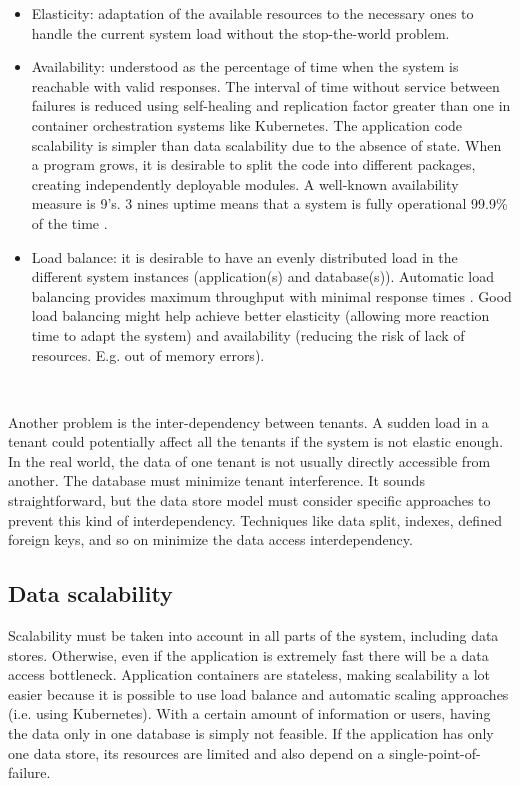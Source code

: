 \documentclass[12pt,english]{article} %
\begin{document}
\begin{itemize}
    \item Elasticity: adaptation of the available resources to the necessary ones to handle the current system load without the stop-the-world problem.
    \item Availability: understood as the percentage of time when the system is reachable with valid responses.
    The interval of time without service between failures is reduced using self-healing and replication factor greater than one in container orchestration systems like Kubernetes.
    The application code scalability is simpler than data scalability due to the absence of state.
    When a program grows, it is desirable to split the code into different packages, creating independently deployable modules.
    A well-known availability measure is 9’s. 3 nines uptime means that a system is fully operational 99.9\% of the time \cite{availability-nines-measure}.
    \item Load balance: it is desirable to have an evenly distributed load in the different system instances (application(s) and database(s)). Automatic load balancing provides maximum throughput with minimal response times \cite{shimonski2003}. 
    Good load balancing might help achieve better elasticity (allowing more reaction time to adapt the system) and availability (reducing the risk of lack of resources. E.g. out of memory errors).
\end{itemize}

\

Another problem is the inter-dependency between tenants.
A sudden load in a tenant could potentially affect all the tenants if the system is not elastic enough.
In the real world, the data of one tenant is not usually directly accessible from another.
The database must minimize tenant interference.
It sounds straightforward, but the data store model must consider specific approaches to prevent this kind of interdependency.
Techniques like data split, indexes, defined foreign keys, and so on minimize the data access interdependency.



\subsection{Data scalability}
Scalability must be taken into account in all parts of the system, including data stores.
Otherwise, even if the application is extremely fast there will be a data access bottleneck.
Application containers are stateless, making scalability a lot easier because it is possible to use load balance and automatic scaling approaches (i.e. using Kubernetes).
With a certain amount of information or users, having the data only in one database is simply not feasible.
If the application has only one data store, its resources are limited and also depend on a single-point-of-failure.
\end{document}
